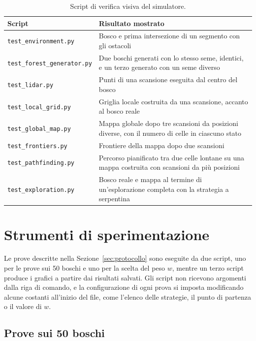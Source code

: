 \begin{table}[!htb]
    \centering
    \small
    \begin{tabular}{@{}lp{}@{}}
        \toprule
        Script & Risultato mostrato \\
        \midrule
        \texttt{test\_environment.py} & Bosco e prima intersezione di un segmento con gli ostacoli \\
        \texttt{test\_forest\_generator.py} & Due boschi generati con lo stesso seme, identici, e un terzo generato con un seme diverso \\
        \texttt{test\_lidar.py} & Punti di una scansione eseguita dal centro del bosco \\
        \texttt{test\_local\_grid.py} & Griglia locale costruita da una scansione, accanto al bosco reale \\
        \texttt{test\_global\_map.py} & Mappa globale dopo tre scansioni da posizioni diverse, con il numero di celle in ciascuno stato \\
        \texttt{test\_frontiers.py} & Frontiere della mappa dopo due scansioni \\
        \texttt{test\_pathfinding.py} & Percorso pianificato tra due celle lontane su una mappa costruita con scansioni da più posizioni \\
        \texttt{test\_exploration.py} & Bosco reale e mappa al termine di un'esplorazione completa con la strategia a serpentina \\
        \bottomrule
    \end{tabular}
    \caption{Script di verifica visiva del simulatore.}
    \label{tab:test}
\end{table}

\section{Strumenti di sperimentazione}
\label{sec:sperimentazione}

Le prove descritte nella Sezione~\ref{sec:protocollo} sono eseguite da due script, uno per le prove sui 50 boschi e uno per la scelta del peso $w$, mentre un terzo script produce i grafici a partire dai risultati salvati. Gli script non ricevono argomenti dalla riga di comando, e la configurazione di ogni prova si imposta modificando alcune costanti all'inizio del file, come l'elenco delle strategie, il punto di partenza o il valore di $w$.

\subsection{Prove sui 50 boschi}
\label{sec:benchmark}

